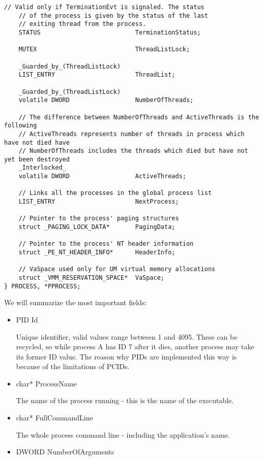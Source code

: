 \begin{appendices}
\begin{lstlisting}[caption={Process Structure},label={lst:ProcessStruct}]
    // Valid only if TerminationEvt is signaled. The status
    // of the process is given by the status of the last
    // exiting thread from the process.
    STATUS                          TerminationStatus;

    MUTEX                           ThreadListLock;

    _Guarded_by_(ThreadListLock)
    LIST_ENTRY                      ThreadList;

    _Guarded_by_(ThreadListLock)
    volatile DWORD                  NumberOfThreads;

    // The difference between NumberOfThreads and ActiveThreads is the following
    // ActiveThreads represents number of threads in process which have not died have
    // NumberOfThreads includes the threads which died but have not yet been destroyed
    _Interlocked_
    volatile DWORD                  ActiveThreads;

    // Links all the processes in the global process list
    LIST_ENTRY                      NextProcess;

    // Pointer to the process' paging structures
    struct _PAGING_LOCK_DATA*       PagingData;

    // Pointer to the process' NT header information
    struct _PE_NT_HEADER_INFO*      HeaderInfo;

    // VaSpace used only for UM virtual memory allocations
    struct _VMM_RESERVATION_SPACE*  VaSpace;
} PROCESS, *PPROCESS;
\end{lstlisting}

We will summarize the most important fields:
\begin{itemize}
	\item PID Id

	Unique identifier, valid values range between 1 and 4095. These can be recycled, so while
process A has ID 7 after it dies, another process may take its former ID value. The reason why PIDs
are implemented this way is because of the limitations of PCIDs.

	\item char* ProcessName

	The name of the process running - this is the name of the executable.

	\item char* FullCommandLine

	The whole process command line - including the application's name.

	\item DWORD NumberOfArguments


\end{itemize}
\end{appendices}
